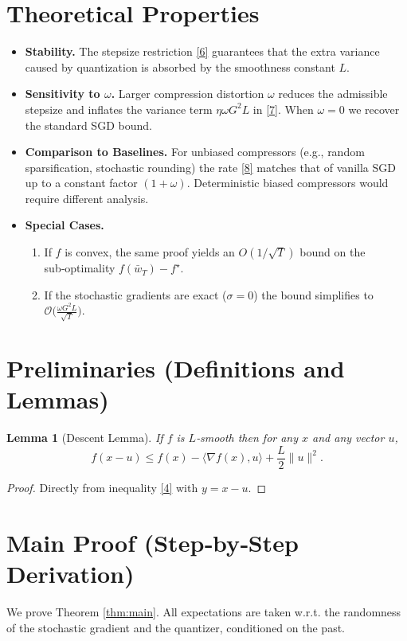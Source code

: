 \documentclass{article}
\newtheorem{lemma}{Lemma}
\begin{document}
\section*{Theoretical Properties}
\begin{itemize}[leftmargin=*]
\item \textbf{Stability.} The stepsize restriction \eqref{6} guarantees that the extra variance caused by quantization is absorbed by the smoothness constant $L$.
\item \textbf{Sensitivity to $\omega$.} Larger compression distortion $\omega$ reduces the admissible stepsize and inflates the variance term $\eta\omega G^{2}L$ in \eqref{7}. When $\omega=0$ we recover the standard SGD bound.
\item \textbf{Comparison to Baselines.} For unbiased compressors (e.g., random sparsification, stochastic rounding) the rate \eqref{8} matches that of vanilla SGD up to a constant factor $(1+\omega)$. Deterministic biased compressors would require different analysis.
\item \textbf{Special Cases.}
\begin{enumerate}
\item If $f$ is convex, the same proof yields an $O(1/\sqrt{T})$ bound on the sub‑optimality $f(\bar w_{T})-f^{\star}$.
\item If the stochastic gradients are exact ($\sigma=0$) the bound simplifies to $\mathcal{O}\big(\tfrac{\omega G^{2}L}{\sqrt{T}}\big)$.
\end{enumerate}
\end{itemize}

\section*{Preliminaries (Definitions and Lemmas)}
\begin{lemma}[Descent Lemma]\label{lem:descent}
If $f$ is $L$‑smooth then for any $x$ and any vector $u$,
\[
f(x-u)\le f(x)-\langle\nabla f(x),u\rangle+\frac{L}{2}\|u\|^{2}.
\tag{9}
\]
\end{lemma}
\begin{proof}
Directly from inequality \eqref{4} with $y=x-u$.
\end{proof}

\section*{Main Proof (Step‑by‑Step Derivation)}
We prove Theorem \ref{thm:main}. All expectations are taken w.r.t. the randomness of the stochastic gradient and the quantizer, conditioned on the past.
\end{document}
